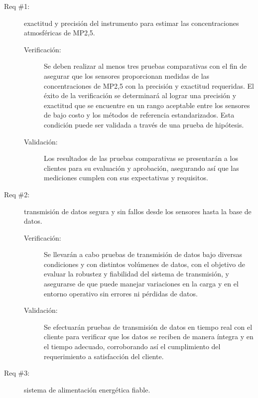 \begin{description} 
	
	\item [Req \#1:] exactitud y precisión del instrumento para estimar las concentraciones atmosféricas de MP2,5.
	
	\begin{description}
		\item [Verificación:] Se deben realizar al menos tres pruebas comparativas con el fin de asegurar que los sensores proporcionan medidas de las concentraciones de MP2,5 con la precisión y exactitud requeridas. El éxito de la verificación se determinará al lograr una precisión y exactitud que se encuentre en un rango aceptable entre los sensores de bajo costo y los métodos de referencia estandarizados. Esta condición puede ser validada a través de una prueba de hipótesis.
		\item [Validación:] Los resultados de las pruebas comparativas se presentarán a los clientes para su evaluación y aprobación, asegurando así que las mediciones cumplen con sus expectativas y requisitos.
	\end{description}


	\item [Req \#2:] transmisión de datos segura y sin fallos desde los sensores hasta la base de datos.
	
	\begin{description}
		\item [Verificación:] Se llevarán a cabo pruebas de transmisión de datos bajo diversas condiciones y con distintos volúmenes de datos, con el objetivo de evaluar la robustez y fiabilidad del sistema de transmisión, y asegurarse de que puede manejar variaciones en la carga y en el entorno operativo sin errores ni pérdidas de datos.
		\item [Validación:] Se efectuarán pruebas de transmisión de datos en tiempo real con el cliente para verificar que los datos se reciben de manera íntegra y en el tiempo adecuado, corroborando así el cumplimiento del requerimiento a satisfacción del cliente.
	\end{description}


	\item [Req \#3:] sistema de alimentación energética fiable.
	

\end{description}

